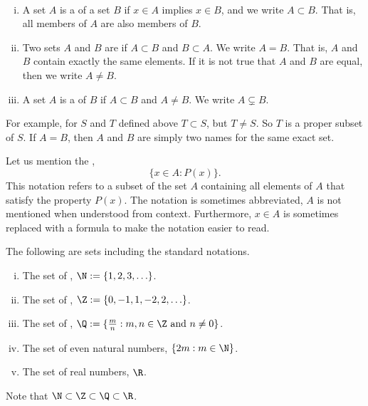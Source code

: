 \documentclass[12pt]{book}
\begin{document}
\begin{defn}
{\ }
\begin{enumerate}[(i)]
\item
A set $A$ is a \emph{}
of a set $B$ if $x \in A$ implies $x \in B$, and we write $A \subset B$.
That is, all members of $A$ are also members of $B$.
\item
Two sets $A$ and $B$ are \emph{} if $A \subset B$ and $B
\subset A$.
 We write $A = B$.
That is, $A$ and $B$ contain exactly the same elements.
If it is not true that $A$ and $B$ are equal, then 
we write $A \not= B$.
\item
A set $A$ is a \emph{} of $B$ if $A \subset B$
and $A \not= B$.
 We write $A \subsetneq B$.
\end{enumerate}
\end{defn}

For example, for $S$ and $T$ defined above $T \subset S$, but
$T \not= S$.
 So $T$ is a proper subset of $S$.
If $A = B$, then $A$ and $B$ are simply two names for the
same exact set.

Let us mention the
\emph{},
\begin{equation*}
\{ x \in A : P(x) \} .
\end{equation*}
This notation refers to a subset of the set $A$ containing all elements
of $A$ that satisfy the property $P(x)$. 
The notation is sometimes
abbreviated, $A$ is not mentioned when understood from context.
Furthermore, $x \in A$ is sometimes replaced with a formula to make the notation
easier to read.  

\begin{example}
The following are sets including the standard notations.
\begin{enumerate}[(i)]
\item The set of \emph{}, $\N := \{ 1, 2, 3, \ldots
\}$.
\item The set of \emph{}, $\Z := \{ 0, -1, 1, -2, 2, \ldots
\}$.
\item The set of \emph{}, $\Q := \{ \frac{m}{n} :  m, n \in \Z
\text{ and } n \not= 0 \}$.
\item The set of even natural numbers, $\{  2m : m \in \N \}$.
\item The set of real numbers, $\R$.
\end{enumerate}

Note that $\N \subset \Z \subset \Q \subset \R$.
\end{example}
\end{document}
